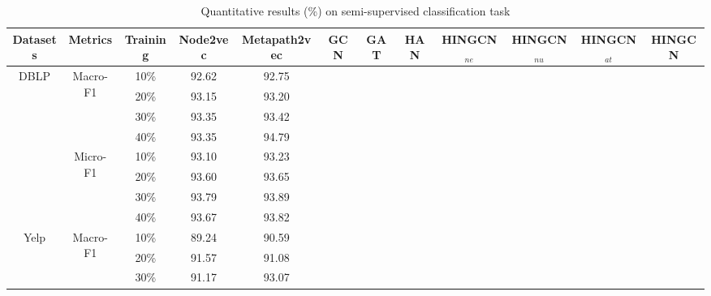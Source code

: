 \begin{table*}[!htbp]
\centering
\caption{Quantitative results (\%) on semi-supervised classification task}
\label{tab:result}
\begin{tabular}{|c|c|c||c|c|c|c|c||c|c|c|c|}
\hline
Datasets                  & Metrics                   & Training & Node2vec & Metapath2vec & GCN & GAT & HAN & HINGCN$_{ne}$ & HINGCN$_{nu}$ & HINGCN$_{at}$ & HINGCN \\ \hline
\multirow{8}{*}{DBLP}     & \multirow{4}{*}{Macro-F1} & 10\%     &  92.62   &   92.75      &     &     &     &        &        &        &        \\
                          &                           & 20\%     &  93.15   &   93.20      &     &     &     &        &        &        &        \\
                          &                           & 30\%     &  93.35   &   93.42      &     &     &     &        &        &        &        \\
                          &                           & 40\%     &  93.35   &   94.79      &     &     &     &        &        &        &        \\ \cline{2-12} 
                          & \multirow{4}{*}{Micro-F1} & 10\%     &  93.10   &   93.23      &     &     &     &        &        &        &        \\
                          &                           & 20\%     &  93.60   &   93.65      &     &     &     &        &        &        &        \\
                          &                           & 30\%     &  93.79   &   93.89      &     &     &     &        &        &        &        \\
                          &                           & 40\%     &  93.67   &   93.82      &     &     &     &        &        &        &        \\ \hline
\multirow{8}{*}{Yelp}     & \multirow{4}{*}{Macro-F1} & 10\%     &  89.24   &   90.59      &     &     &     &        &        &        &        \\
                          &                           & 20\%     &  91.57   &   91.08      &     &     &     &        &        &        &        \\
                          &                           & 30\%     &  91.17   &   93.07      &     &     &     &        &        &        &        \\

\end{tabular}
\end{table*}

